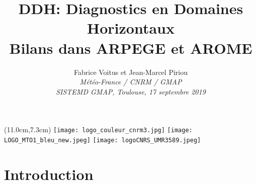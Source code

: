 \documentclass[aspectratio=169]{beamer}
\title{
{\bf DDH: Diagnostics en Domaines Horizontaux} \\
\vspace{2mm}
{\bf Bilans dans ARPEGE et AROME }
}
\author{
Fabrice Voitus et Jean-Marcel Piriou \\
\vspace{4mm}
{\it Météo-France / CNRM / GMAP} \\
\vspace{8mm}
{\it SISTEMD GMAP, Toulouse, 17 septembre 2019}
}
\date{ }
\begin{document}
\newcommand{\logos}[0]{
\begin{textblock*}{3cm}(13.4cm,8.0cm) 
\texttt{[image: logo\_couleur\_cnrm3\_LR.jpg]}
\hspace{0mm} 
\texttt{[image: LOGO\_MTO1\_bleu\_new\_BR.jpeg]}
\hspace{0mm} 
\texttt{[image: logoCNRS\_UMR3589\_BR.jpeg]}  
\end{textblock*}
}

\addtocounter{framenumber}{-1} %


 \begin{frame}[plain]
  \titlepage
\begin{textblock*}{6cm}(11.0cm,7.3cm)
\texttt{[image: logo\_couleur\_cnrm3.jpg]}
\hspace{2mm}
\texttt{[image: LOGO\_MTO1\_bleu\_new.jpeg]}
\hspace{2mm}
\texttt{[image: logoCNRS\_UMR3589.jpeg]}
\end{textblock*}
\end{frame}



\section{Introduction}

\end{document}
